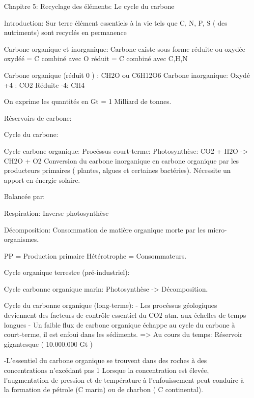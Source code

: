 Chapitre 5: Recyclage des éléments: Le cycle du carbone


Introduction:
Sur terre élément essentiels à la vie tels que C, N, P, S ( des nutriments) sont recyclés en permanence


Carbone organique et inorganique:
Carbone existe sous forme réduite ou oxydée
oxydéé = C combiné avec O
réduit = C combiné avec C,H,N


Carbone organique (réduit 0 ) : CH2O ou C6H12O6
Carbone inorganique:
Oxydé +4 : CO2
Réduite -4: CH4


On exprime les quantités en Gt  = 1 Milliard de tonnes.


Réservoirs de carbone:
  





Cycle du carbone:
  



Cycle carbone organique:
Procéssus court-terme:
Photosynthèse: CO2 + H2O -> CH2O + O2
Conversion du carbone inorganique en carbone organique par les producteurs primaires ( plantes, algues et certaines bactéries). Nécessite un apport en énergie solaire.


Balancée par:


Respiration: Inverse photosynthèse


Décomposition: Consommation de matière organique morte par les micro-organismes.


PP = Production primaire
Hétérotrophe = Consommateurs.


Cycle organique terrestre (pré-industriel):
  





Cycle carbonne organique marin:
Photosynthèse -> Décomposition.


  





Cycle du carbonne organique (long-terme):
- Les procéssus géologiques deviennent des facteurs de contrôle essentiel du CO2 atm. aux échelles de temps longues
- Un faible flux de carbone organique échappe au cycle du carbone à court-terme, il est enfoui dans les sédiments.
        => Au cours du temps: Réservoir gigantesque ( 10.000.000 Gt )


-L’essentiel du carbone organique se trouvent dans des roches à des concentrations n’excédant pas 1%
Lorsque la concentration est élevée, l’augmentation de pression et de température à l’enfouissement peut conduire à la formation de pétrole (C marin) ou de charbon ( C continental).


